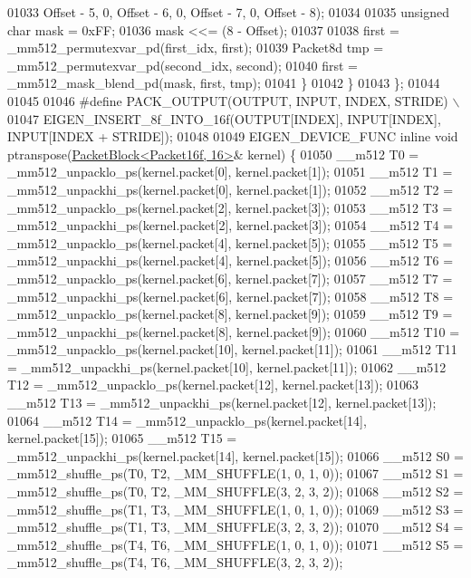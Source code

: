 \begin{DoxyCode}
01033           Offset - 5, 0, Offset - 6, 0, Offset - 7, 0, Offset - 8);
01034 
01035       \textcolor{keywordtype}{unsigned} \textcolor{keywordtype}{char} mask = 0xFF;
01036       mask <<= (8 - Offset);
01037 
01038       first = \_mm512\_permutexvar\_pd(first\_idx, first);
01039       Packet8d tmp = \_mm512\_permutexvar\_pd(second\_idx, second);
01040       first = \_mm512\_mask\_blend\_pd(mask, first, tmp);
01041     \}
01042   \}
01043 \};
01044 
01045 
01046 \textcolor{preprocessor}{#define PACK\_OUTPUT(OUTPUT, INPUT, INDEX, STRIDE) \(\backslash\)}
01047 \textcolor{preprocessor}{  EIGEN\_INSERT\_8f\_INTO\_16f(OUTPUT[INDEX], INPUT[INDEX], INPUT[INDEX + STRIDE]);}
01048 
01049 EIGEN\_DEVICE\_FUNC \textcolor{keyword}{inline} \textcolor{keywordtype}{void} ptranspose(\hyperlink{struct_eigen_1_1internal_1_1_packet_block}{PacketBlock<Packet16f, 16>}& kernel) \{
01050   \_\_m512 T0 = \_mm512\_unpacklo\_ps(kernel.packet[0], kernel.packet[1]);
01051   \_\_m512 T1 = \_mm512\_unpackhi\_ps(kernel.packet[0], kernel.packet[1]);
01052   \_\_m512 T2 = \_mm512\_unpacklo\_ps(kernel.packet[2], kernel.packet[3]);
01053   \_\_m512 T3 = \_mm512\_unpackhi\_ps(kernel.packet[2], kernel.packet[3]);
01054   \_\_m512 T4 = \_mm512\_unpacklo\_ps(kernel.packet[4], kernel.packet[5]);
01055   \_\_m512 T5 = \_mm512\_unpackhi\_ps(kernel.packet[4], kernel.packet[5]);
01056   \_\_m512 T6 = \_mm512\_unpacklo\_ps(kernel.packet[6], kernel.packet[7]);
01057   \_\_m512 T7 = \_mm512\_unpackhi\_ps(kernel.packet[6], kernel.packet[7]);
01058   \_\_m512 T8 = \_mm512\_unpacklo\_ps(kernel.packet[8], kernel.packet[9]);
01059   \_\_m512 T9 = \_mm512\_unpackhi\_ps(kernel.packet[8], kernel.packet[9]);
01060   \_\_m512 T10 = \_mm512\_unpacklo\_ps(kernel.packet[10], kernel.packet[11]);
01061   \_\_m512 T11 = \_mm512\_unpackhi\_ps(kernel.packet[10], kernel.packet[11]);
01062   \_\_m512 T12 = \_mm512\_unpacklo\_ps(kernel.packet[12], kernel.packet[13]);
01063   \_\_m512 T13 = \_mm512\_unpackhi\_ps(kernel.packet[12], kernel.packet[13]);
01064   \_\_m512 T14 = \_mm512\_unpacklo\_ps(kernel.packet[14], kernel.packet[15]);
01065   \_\_m512 T15 = \_mm512\_unpackhi\_ps(kernel.packet[14], kernel.packet[15]);
01066   \_\_m512 S0 = \_mm512\_shuffle\_ps(T0, T2, \_MM\_SHUFFLE(1, 0, 1, 0));
01067   \_\_m512 S1 = \_mm512\_shuffle\_ps(T0, T2, \_MM\_SHUFFLE(3, 2, 3, 2));
01068   \_\_m512 S2 = \_mm512\_shuffle\_ps(T1, T3, \_MM\_SHUFFLE(1, 0, 1, 0));
01069   \_\_m512 S3 = \_mm512\_shuffle\_ps(T1, T3, \_MM\_SHUFFLE(3, 2, 3, 2));
01070   \_\_m512 S4 = \_mm512\_shuffle\_ps(T4, T6, \_MM\_SHUFFLE(1, 0, 1, 0));
01071   \_\_m512 S5 = \_mm512\_shuffle\_ps(T4, T6, \_MM\_SHUFFLE(3, 2, 3, 2));

\end{DoxyCode}
